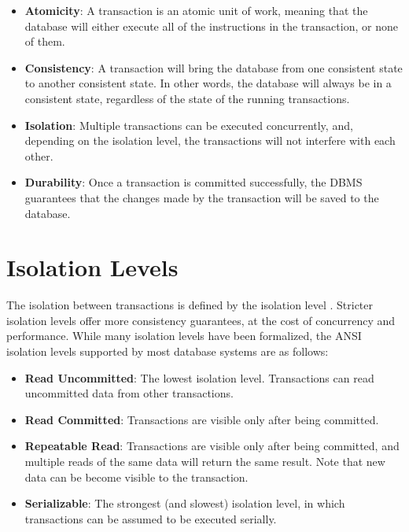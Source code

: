 \begin{itemize}
    \item \textbf{Atomicity}: A transaction is an atomic unit of work, meaning that the database will either execute all of the instructions in the transaction, or none of them.
    \item \textbf{Consistency}: A transaction will bring the database from one consistent state to another consistent state. In other words, the database will always be in a consistent state, regardless of the state of the running transactions.
    \item \textbf{Isolation}: Multiple transactions can be executed concurrently, and, depending on the isolation level, the transactions will not interfere with each other.
    \item \textbf{Durability}: Once a transaction is committed successfully, the DBMS guarantees that the changes made by the transaction will be saved to the database.
\end{itemize}


\section{Isolation Levels}

The isolation between transactions is defined by the isolation level \cite{adya2000generalized}. Stricter isolation levels offer more consistency guarantees, at the cost of concurrency and performance. While many isolation levels have been formalized, the ANSI isolation levels supported by most database systems \cite{melton1992iso_ANSI} are as follows:

\begin{itemize}
    \item \textbf{Read Uncommitted}: The lowest isolation level. Transactions can read uncommitted data from other transactions.
    \item \textbf{Read Committed}: Transactions are visible only after being committed.
    \item \textbf{Repeatable Read}: Transactions are visible only after being committed, and multiple reads of the same data will return the same result. Note that new data can be become visible to the transaction.
    \item \textbf{Serializable}: The strongest (and slowest) isolation level, in which transactions can be assumed to be executed serially.
\end{itemize}

